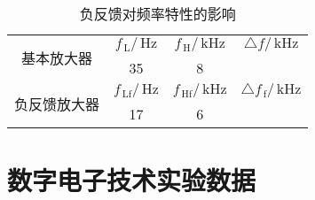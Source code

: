 \documentclass{ctexart}
\renewcommand{\rm}{\,\mathrm}
\begin{document}
    \begin{table}[htbp]
    	\centering
    	\caption{负反馈对频率特性的影响}
    	\begin{tabular}{|c|c|c|c|}
    		\hline
    		\multirow{2}{*}{基本放大器} & $f_{\rm{L}}/\rm{Hz}$     & $f_{\rm{H}}/\rm{kHz}$     & $\triangle f/\rm{kHz}$ \\
    		\cline{2-4}          & 35    & 8     &  \\
    		\hline
    		\multirow{2}{*}{负反馈放大器} & $f_{\rm{Lf}}/\rm{Hz}$     & $f_{\rm{Hf}}/\rm{kHz}$     & $\triangle f_{\rm{f}}/\rm{kHz}$ \\
    		\cline{2-4}          & 17    & 6     &  \\
    		\hline
    	\end{tabular}%
    \end{table}%
    \newpage
    \section{数字电子技术实验数据}
\end{document}
